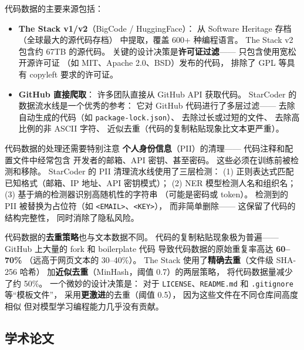 代码数据的主要来源包括：

\begin{itemize}[noitemsep]
  \item \textbf{The Stack v1/v2}（BigCode / HuggingFace）：
        从 Software Heritage 存档（全球最大的源代码存档）
        中提取，覆盖 600+ 种编程语言。
        The Stack v2 包含约 67TB 的源代码。
        关键的设计决策是\textbf{许可证过滤}——
        只包含使用宽松开源许可证
        （如 MIT、Apache 2.0、BSD）发布的代码，
        排除了 GPL 等具有 copyleft 要求的许可证。
  \item \textbf{GitHub 直接爬取}：
        许多团队直接从 GitHub API 获取代码。
        StarCoder 的数据流水线是一个优秀的参考：
        它对 GitHub 代码进行了多层过滤——
        去除自动生成的代码（如 \texttt{package-lock.json}）、
        去除过长或过短的文件、
        去除高比例的非 ASCII 字符、
        近似去重（代码的复制粘贴现象比文本更严重）。
\end{itemize}

代码数据的处理还需要特别注意
\textbf{个人身份信息}（PII）的清理——
代码注释和配置文件中经常包含
开发者的邮箱、API 密钥、甚至密码。
这些必须在训练前被检测和移除。
StarCoder 的 PII 清理流水线使用了三层检测：
(1) 正则表达式匹配已知格式（邮箱、IP 地址、API 密钥模式）；
(2) NER 模型检测人名和组织名；
(3) 基于熵的检测器识别高随机性的字符串
（可能是密码或 token）。
检测到的 PII 被替换为占位符（如 \texttt{<EMAIL>}、\texttt{<KEY>}），
而非简单删除——
这保留了代码的结构完整性，
同时消除了隐私风险。

代码数据的\textbf{去重策略}也与文本数据不同。
代码的复制粘贴现象极为普遍——
GitHub 上大量的 fork 和 boilerplate 代码
导致代码数据的原始重复率高达 \textbf{60--70\%}
（远高于网页文本的 30--40\%）。
The Stack 使用了\textbf{精确去重}（文件级 SHA-256 哈希）
加\textbf{近似去重}（MinHash，阈值 0.7）的两层策略，
将代码数据量减少了约 50\%。
一个微妙的设计决策是：
对于 \texttt{LICENSE}、\texttt{README.md}
和 \texttt{.gitignore} 等``模板文件''，
采用\textbf{更激进}的去重（阈值 0.5），
因为这些文件在不同仓库间高度相似
但对模型学习编程能力几乎没有贡献。

\subsection{学术论文}

